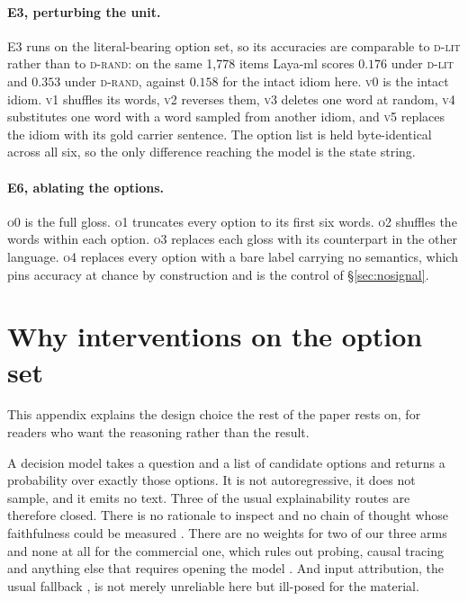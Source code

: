 \documentclass[11pt]{article}
\newcommand{\Drand}{\textsc{d-rand}}
\newcommand{\Dlit}{\textsc{d-lit}}
\begin{document}
\paragraph{E3, perturbing the unit.} E3 runs on the literal-bearing option set,
so its accuracies are comparable to \Dlit{} rather than to \Drand: on the same
1{,}778 items Laya-ml scores $0.176$ under \Dlit{} and $0.353$ under \Drand,
against $0.158$ for the intact idiom here. \textsc{v0} is the intact idiom.
\textsc{v1} shuffles its words, \textsc{v2} reverses them, \textsc{v3} deletes
one word at random, \textsc{v4} substitutes one word with a word sampled from
another idiom, and \textsc{v5} replaces the idiom with its gold carrier
sentence. The option list is held byte-identical across all six, so the only
difference reaching the model is the state string.

\paragraph{E6, ablating the options.} \textsc{o0} is the full gloss. \textsc{o1}
truncates every option to its first six words. \textsc{o2} shuffles the words
within each option. \textsc{o3} replaces each gloss with its counterpart in the
other language. \textsc{o4} replaces every option with a bare label carrying no
semantics, which pins accuracy at chance by construction and is the control of
\S\ref{sec:nosignal}.

\section{Why interventions on the option set}
\label{app:why}

This appendix explains the design choice the rest of the paper rests on, for
readers who want the reasoning rather than the result.

A decision model takes a question and a list of candidate options and returns a
probability over exactly those options. It is not autoregressive, it does not
sample, and it emits no text. Three of the usual explainability routes are
therefore closed. There is no rationale to inspect and no chain of thought whose
faithfulness could be measured \citep{jacovi2020faithfulness,turpin2023unfaithful}.
There are no weights for two of our three arms and none at all for the
commercial one, which rules out probing, causal tracing and anything else that
requires opening the model \citep{oh2026tug}. And input attribution, the usual
fallback \citep{ribeiro2016lime,lundberg2017shap}, is not merely unreliable here
\citep{jain2019attention,adebayo2018sanity,hooker2019roar} but ill-posed for the
material.
\end{document}
